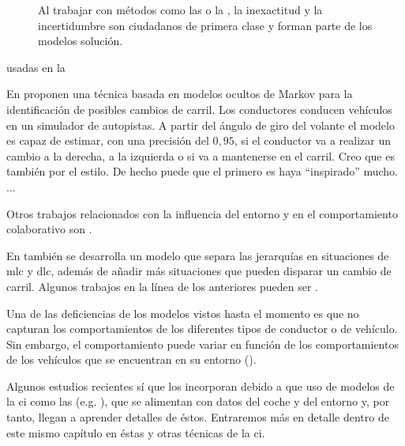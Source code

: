 \begin{figure}
	\caption{Al trabajar con métodos como las  o la , la inexactitud y la incertidumbre son ciudadanos de primera clase y forman parte de los modelos solución.}
	\label{fig:ann-and-fl-work-with-uncertainty}
\end{figure}







 usadas en la 

En \cite{Hou2011} proponen una técnica basada en modelos ocultos de Markov para la identificación de posibles cambios de carril. Los conductores conducen vehículos en un simulador de autopistas. A partir del ángulo de giro del volante el modelo es capaz de estimar, con una precisión del $0,95$, si el conductor va a realizar un cambio a la derecha, a la izquierda o si va a mantenerse en el carril. Creo que \cite{Berndt2008} es también por el estilo. De hecho puede que el primero es haya \enquote{inspirado} mucho.
...

Otros trabajos relacionados con la influencia del entorno y en el comportamiento colaborativo son \cite{Ahmed1999}.

En \cite{Hidas2002} también se desarrolla un modelo que separa las jerarquías en situaciones de \gls{mlc} y \gls{dlc}, además de añadir más situaciones que pueden disparar un cambio de carril. Algunos trabajos en la línea de los anteriores pueden ser \cite{Yang1996, Halati1997, Ahmed1999}.



Una de las deficiencias de los modelos vistos hasta el momento es que no capturan los comportamientos de los diferentes tipos de conductor o de vehículo. Sin embargo, el comportamiento puede variar en función de los comportamientos de los vehículos que se encuentran en su entorno (\cite{Tordeux2010}).

Algunos estudios recientes sí que los incorporan debido a que uso de modelos de la \gls{ci} como las  (e.g. \cite{Simonelli2009, Fusco2013}), que se alimentan con datos del coche y del entorno y, por tanto, llegan a aprender detalles de éstos. Entraremos más en detalle dentro de este mismo capítulo en éstas y otras técnicas de la \gls{ci}.

